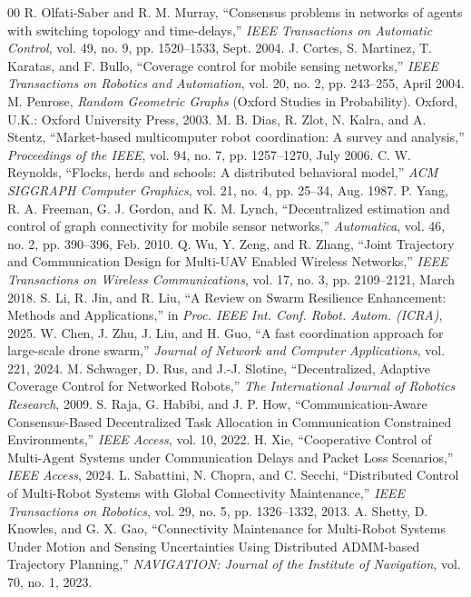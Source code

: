 \documentclass[conference]{IEEEtran}
\begin{document}
\begin{thebibliography}{00}
 R. Olfati-Saber and R. M. Murray, ``Consensus problems in networks of agents with switching topology and time-delays,'' \textit{IEEE Transactions on Automatic Control}, vol. 49, no. 9, pp. 1520--1533, Sept. 2004.
 J. Cortes, S. Martinez, T. Karatas, and F. Bullo, ``Coverage control for mobile sensing networks,'' \textit{IEEE Transactions on Robotics and Automation}, vol. 20, no. 2, pp. 243--255, April 2004.
 M. Penrose, \textit{Random Geometric Graphs} (Oxford Studies in Probability). Oxford, U.K.: Oxford University Press, 2003.
 M. B. Dias, R. Zlot, N. Kalra, and A. Stentz, ``Market-based multicomputer robot coordination: A survey and analysis,'' \textit{Proceedings of the IEEE}, vol. 94, no. 7, pp. 1257--1270, July 2006.
 C. W. Reynolds, ``Flocks, herds and schools: A distributed behavioral model,'' \textit{ACM SIGGRAPH Computer Graphics}, vol. 21, no. 4, pp. 25--34, Aug. 1987.
 P. Yang, R. A. Freeman, G. J. Gordon, and K. M. Lynch, ``Decentralized estimation and control of graph connectivity for mobile sensor networks,'' \textit{Automatica}, vol. 46, no. 2, pp. 390--396, Feb. 2010.
 Q. Wu, Y. Zeng, and R. Zhang, ``Joint Trajectory and Communication Design for Multi-UAV Enabled Wireless Networks,'' \textit{IEEE Transactions on Wireless Communications}, vol. 17, no. 3, pp. 2109--2121, March 2018.
 S. Li, R. Jin, and R. Liu, ``A Review on Swarm Resilience Enhancement: Methods and Applications,'' in \textit{Proc. IEEE Int. Conf. Robot. Autom. (ICRA)}, 2025.
 W. Chen, J. Zhu, J. Liu, and H. Guo, ``A fast coordination approach for large-scale drone swarm,'' \textit{Journal of Network and Computer Applications}, vol. 221, 2024.
 M. Schwager, D. Rus, and J.-J. Slotine, ``Decentralized, Adaptive Coverage Control for Networked Robots,'' \textit{The International Journal of Robotics Research}, 2009.
 S. Raja, G. Habibi, and J. P. How, ``Communication-Aware Consensus-Based Decentralized Task Allocation in Communication Constrained Environments,'' \textit{IEEE Access}, vol. 10, 2022.
 H. Xie, ``Cooperative Control of Multi-Agent Systems under Communication Delays and Packet Loss Scenarios,'' \textit{IEEE Access}, 2024.
 L. Sabattini, N. Chopra, and C. Secchi, ``Distributed Control of Multi-Robot Systems with Global Connectivity Maintenance,'' \textit{IEEE Transactions on Robotics}, vol. 29, no. 5, pp. 1326--1332, 2013.
 A. Shetty, D. Knowles, and G. X. Gao, ``Connectivity Maintenance for Multi-Robot Systems Under Motion and Sensing Uncertainties Using Distributed ADMM-based Trajectory Planning,'' \textit{NAVIGATION: Journal of the Institute of Navigation}, vol. 70, no. 1, 2023.

\end{thebibliography}
\end{document}
